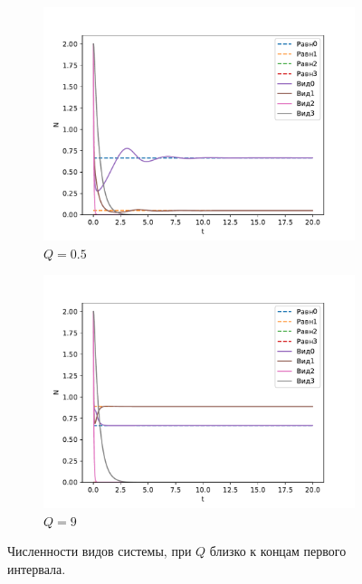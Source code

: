\begin{figure}[H]
    \centering
    \begin{subfigure}[t]{.45\linewidth}
        \centering
        \includegraphics[width=\textwidth]{pictures/cycle/exp1_Q0.5.pdf}
        \caption{\(Q = 0.5\)}
    \end{subfigure}
    \begin{subfigure}[t]{.45\linewidth}
            \centering
            \includegraphics[width=\textwidth]{pictures/cycle/exp1_Q9.pdf}
            \caption{\(Q = 9\)}
        \end{subfigure}
    \caption{Численности видов системы, при \(Q\) близко к концам первого интервала.}  \label{fig:cycle_exp1_q1}
\end{figure}


